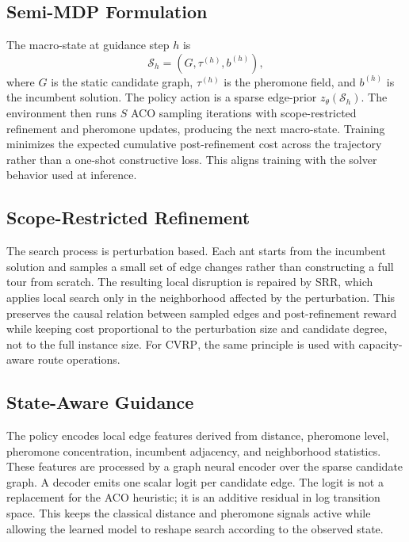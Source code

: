 \documentclass[11pt]{article}
\newcommand{\CVRP}{\textsc{CVRP}}
\newcommand{\SRR}{\textsc{SRR}}
\begin{document}
\subsection{Semi-MDP Formulation}
\label{sec:semimdp}

The macro-state at guidance step $h$ is
\begin{equation}
\mathcal{S}_h = (G, \tau^{(h)}, b^{(h)}),
\end{equation}
where $G$ is the static candidate graph, $\tau^{(h)}$ is the pheromone field, and $b^{(h)}$ is the incumbent solution.
The policy action is a sparse edge-prior $z_\theta(\mathcal{S}_h)$.
The environment then runs $S$ ACO sampling iterations with scope-restricted refinement and pheromone updates, producing the next macro-state.
Training minimizes the expected cumulative post-refinement cost across the trajectory rather than a one-shot constructive loss.
This aligns training with the solver behavior used at inference.

\subsection{Scope-Restricted Refinement}
\label{sec:srr}

The search process is perturbation based.
Each ant starts from the incumbent solution and samples a small set of edge changes rather than constructing a full tour from scratch.
The resulting local disruption is repaired by \SRR{}, which applies local search only in the neighborhood affected by the perturbation.
This preserves the causal relation between sampled edges and post-refinement reward while keeping cost proportional to the perturbation size and candidate degree, not to the full instance size.
For \CVRP{}, the same principle is used with capacity-aware route operations.

\subsection{State-Aware Guidance}
\label{sec:state-guidance}

The policy encodes local edge features derived from distance, pheromone level, pheromone concentration, incumbent adjacency, and neighborhood statistics.
These features are processed by a graph neural encoder over the sparse candidate graph.
A decoder emits one scalar logit per candidate edge.
The logit is not a replacement for the ACO heuristic; it is an additive residual in log transition space.
This keeps the classical distance and pheromone signals active while allowing the learned model to reshape search according to the observed state.
\end{document}
